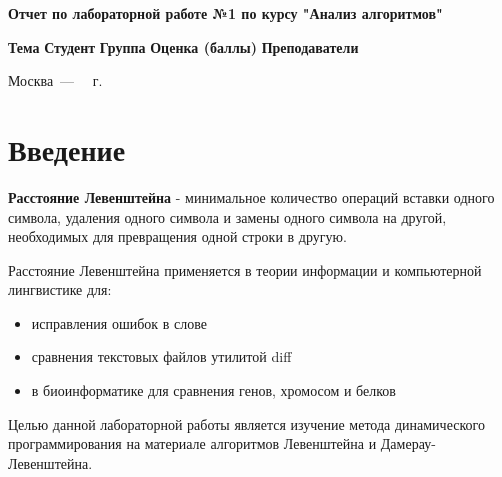 \documentclass[12pt]{report}
\begin{document}
\begin{titlepage}
	
	\begin{center}
		\Large\textbf{Отчет по лабораторной работе №1 по курсу "Анализ алгоритмов"}\newline
	\end{center}
	
	\noindent\textbf{Тема} \underline{}\newline\newline\newline
	\noindent\textbf{Студент} \underline{}\newline\newline
	\noindent\textbf{Группа} \underline{}\newline\newline
	\noindent\textbf{Оценка (баллы)} \underline{\text{~~~~~~~~~~~~~~~~~~~}}\newline\newline
	\noindent\textbf{Преподаватели} \underline{}\newline
	
	\begin{center}
		\vfill
		Москва~---~\the\year
		~г.
	\end{center}
\end{titlepage}


\tableofcontents

\newpage
\chapter{Введение}
\textbf{Расстояние Левенштейна} - минимальное количество операций вставки одного символа, удаления одного символа и замены одного символа на другой, необходимых для превращения одной строки в другую.

Расстояние Левенштейна применяется в теории информации и компьютерной лингвистике для:

\begin{itemize}
	\item исправления ошибок в слове
	\item сравнения текстовых файлов утилитой diff
	\item в биоинформатике для сравнения генов, хромосом и белков
\end{itemize}

Целью данной лабораторной работы является изучение метода динамического программирования на материале алгоритмов
Левенштейна и Дамерау-Левенштейна. 
\end{document}
